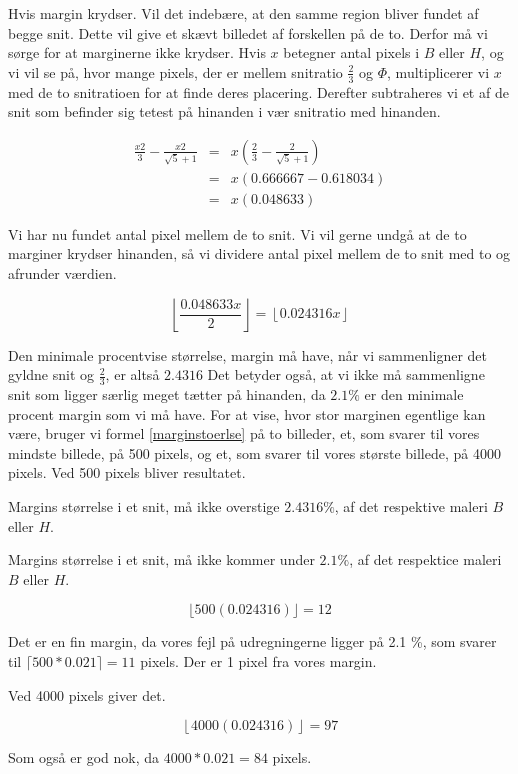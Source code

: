 Hvis margin krydser. Vil det indebære, at den samme region bliver fundet
af begge snit. Dette vil give et skævt billedet af forskellen på de to.
Derfor må vi sørge for at marginerne ikke krydser. Hvis $x$ betegner
antal pixels i $B$ eller $H$, og vi vil se på, hvor mange pixels, der er
mellem snitratio $\frac{2}{3}$ og $\varPhi$, multiplicerer vi $x$ med de
to snitratioen for at finde deres placering. Derefter subtraheres vi et
af de snit som befinder sig tetest på hinanden i vær snitratio med
hinanden.


\begin{eqnarray}
	\frac{x2}{3} - \frac{x2}{\sqrt{5}+1} & = & x(\frac{2}{3} - \frac{2}{\sqrt{5} + 1}) \nonumber \\
	& = & x(0.666667-0.618034) \\ \nonumber
	& = & x(0.048633)
\end{eqnarray}

Vi har nu fundet antal pixel mellem de to snit. Vi vil gerne undgå at
de to marginer krydser hinanden, så vi dividere antal pixel mellem de to snit med to og afrunder værdien.

\begin{equation}
	\left\lfloor \frac{0.048633x}{2}\right\rfloor = \left\lfloor0.024316x \right\rfloor
	\label{marginstoerlse}
\end{equation}

Den minimale procentvise størrelse, margin må have, når vi
sammenligner det gyldne snit og $\frac{2}{3}$, er altså $2.4316$ Det
betyder også, at vi ikke må sammenligne snit som ligger særlig meget
tætter på hinanden, da $2.1\%$ er den minimale procent margin som vi må
have. For at vise, hvor stor marginen egentlige kan være, bruger vi formel \ref{marginstoerlse} på to billeder, et, som svarer til vores mindste billede, på
500 pixels, og et, som svarer til vores største billede, på 4000 pixels. Ved
500 pixels bliver resultatet.

\begin{definition}
	Margins størrelse i et snit, må ikke overstige $2.4316 \%$, af det respektive maleri $B$ eller $H$.
	\label{margin_max}
\end{definition}

\begin{definition}
	Margins størrelse i et snit, må ikke kommer under $2.1 \%$, af det respektice maleri $B$ eller $H$.
	\label{margin_min}
\end{definition}

\begin{equation}
	 \lfloor 500(0.024316)\rfloor = 12
\end{equation}

Det er en fin margin, da vores fejl på udregningerne ligger på 2.1 \%,
som svarer til $\lceil 500*0.021 \rceil = 11$ pixels. Der er 1 pixel fra vores
margin.

Ved 4000 pixels giver det.

\begin{equation}
	 \left\lfloor 4000(0.024316)\right\rfloor = 97
\end{equation}

Som også er god nok, da $4000*0.021 = 84$ pixels.
